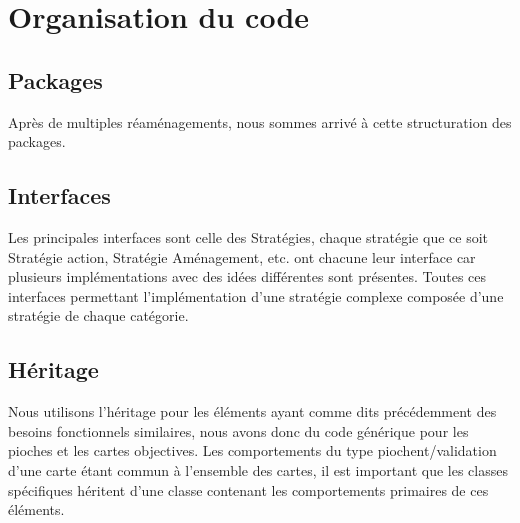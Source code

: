 \chapter{Organisation du code }

\section{Packages}

\begin{minipage}{0.45\textwidth}
\end{minipage}
\begin{minipage}{0.45\textwidth}
  Après de multiples réaménagements, nous sommes arrivé à cette structuration des packages.\\
  
\end{minipage}

\section{Interfaces}
Les principales interfaces sont celle des Stratégies, chaque stratégie que ce soit Stratégie action, Stratégie Aménagement, etc. ont chacune leur interface car plusieurs implémentations avec des idées différentes sont présentes. Toutes ces interfaces permettant l'implémentation d'une stratégie complexe composée d'une stratégie de chaque catégorie. 

\section{Héritage}
Nous utilisons l'héritage pour les éléments ayant comme dits précédemment des besoins fonctionnels similaires, nous avons donc du code générique pour les pioches et les cartes objectives. Les comportements du type piochent/validation d'une carte étant commun à l'ensemble des cartes, il est important que les classes spécifiques héritent d'une classe contenant les comportements primaires de ces éléments.